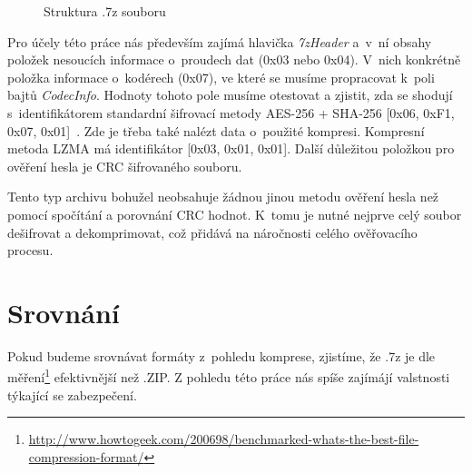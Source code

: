 \begin{figure}[ht]
    \begin{center}
    \end{center}
    \caption{Struktura .7z souboru \cite{Pavlov:2015}}
    \label{7zstruct}
\end{figure}
Pro účely této práce nás především zajímá hlavička {\it 7zHeader} a~v~ní obsahy položek nesoucích
informace o~proudech dat (0x03 nebo 0x04). V~nich konkrétně položka informace o~kodérech (0x07),
ve které se musíme propracovat k~poli bajtů {\it CodecInfo}. Hodnoty tohoto pole musíme otestovat
a zjistit, zda se shodují s~identifikátorem standardní šifrovací metody AES-256 + SHA-256
[0x06, 0xF1, 0x07, 0x01]~\cite{Pavlov:2015}. Zde je třeba také nalézt data o~použité kompresi.
Kompresní metoda LZMA má identifikátor [0x03, 0x01, 0x01]. Další důležitou položkou pro ověření
hesla je CRC šifrovaného souboru.

Tento typ archivu bohužel neobsahuje žádnou jinou metodu ověření hesla než pomocí spočítání a
porovnání CRC hodnot. K~tomu je nutné nejprve celý soubor dešifrovat a dekomprimovat, což přidává
na náročnosti celého ověřovacího procesu.

\section{Srovnání}
Pokud budeme srovnávat formáty z~pohledu komprese, zjistíme, že .7z je dle
měření\footnote{\url{http://www.howtogeek.com/200698/benchmarked-whats-the-best-file-compression-format/}}
efektivnější než .ZIP. Z pohledu této práce nás spíše zajímájí valstnosti týkající se zabezpečení.

